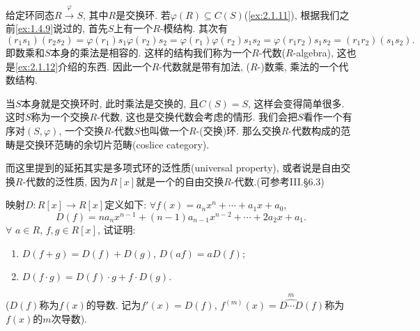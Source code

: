 \begin{remark}
    给定环同态$R \overset{\varphi}\to S$, 其中$R$是交换环. 若$\varphi(R) \subseteq C(S)$(\ref{ex:2.1.11}), 根据我们之前\ref{ex:1.4.9}说过的, 首先$S$上有一个$R$-模结构. 其次有
    \[
        (r_1s_1)(r_2s_2) = \varphi(r_1)s_1\varphi(r_2)s_2 = \varphi(r_1)\varphi(r_2)s_1s_2 = \varphi(r_1r_2)s_1s_2 = (r_1r_2)(s_1s_2).
    \]
    即数乘和$S$本身的乘法是相容的. 这样的结构我们称为一个$R$-代数($R$-algebra), 这也是\ref{ex:2.1.12}介绍的东西. 因此一个$R$-代数就是带有加法, ($R$-)数乘, 乘法的一个代数结构.
    
    当$S$本身就是交换环时, 此时乘法是交换的, 且$C(S) = S$, 这样会变得简单很多. 这时$S$称为一个交换$R$-代数, 这也是交换代数会考虑的情形. 我们会把$S$看作一个有序对$(S, \varphi)$, 一个交换$R$-代数$S$也叫做一个$R$-(交换)环. 那么交换$R$-代数构成的范畴是交换环范畴的余切片范畴(coslice category).
    
    而这里提到的延拓其实是多项式环的泛性质(universal property), 或者说是自由交换$R$-代数的泛性质, 因为$R[x]$就是一个的自由交换$R$-代数.(可参考\cite{aluffi2009algebra}III.\S6.3)
\end{remark}

\begin{problem}\label{ex:2.1.9}
    映射$D:R[x] \longrightarrow R[x]$定义如下: $\forall f(x) = a_nx^n + \cdots + a_1x + a_0$,
    \[
        D(f) = na_nx^{n - 1} + (n - 1)a_{n - 1}x^{n - 2} + \cdots + 2a_2x + a_1.
    \]
    $\forall$ $a \in R$, $f, g \in R[x]$, 试证明:
    \begin{enumerate}[(1)]
        \item $D(f + g) = D(f) + D(g)$, $D(af) = aD(f)$;
        \item $D(f \cdot g) = D(f) \cdot g + f \cdot D(g)$.
    \end{enumerate}
    ($D(f)$称为$f(x)$的导数. 记为$f'(x) = D(f),\, f^{(m)}(x) = \overset{m}{\widehat{D \cdots D}}(f)$称为$f(x)$的$m$次导数).
\end{problem}

